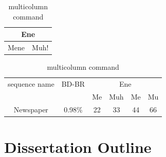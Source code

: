\begin{table}
    \label{tab:tabular_example9}
    \centering
    \begin{tabular}{c c} \hline \multicolumn{2}{c}{Ene} \\ \hline Mene & Muh! \\ \hline \end{tabular}
    \caption{multicolumn command}
\end{table}

\begin{table}
    \label{tab:tabular_example10}
    \centering
    \begin{tabular}{c c c c c c}
        \hline
        sequence name &
        BD-BR &
        \multicolumn{4}{c}{Ene} \\
        \cline{3-6}
        {} & {} & Me & Muh & Me & Mu\\
        \hline
        Newspaper & 0.98\% & 22 & 33 & 44 & 66\\
    \end{tabular}
    \caption{multicolumn command}
\end{table}





\section{Dissertation Outline}\label{sec:outline}




